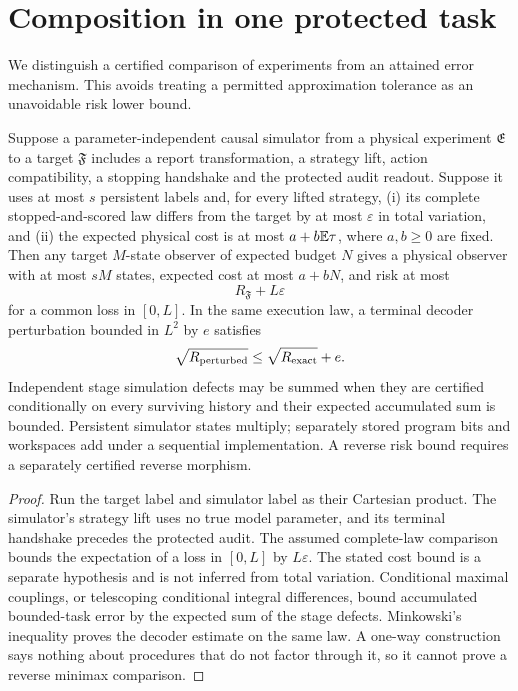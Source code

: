 \section{Composition in one protected task}\label{sec:composition}
We distinguish a certified comparison of experiments from an attained error mechanism. This avoids treating a permitted approximation tolerance as an unavoidable risk lower bound.

\begin{proposition}\label{prop:composition}
Suppose a parameter-independent causal simulator from a physical experiment $\mathfrak E$ to a target $\mathfrak F$ includes a report transformation, a strategy lift, action compatibility, a stopping handshake and the protected audit readout. Suppose it uses at most $s$ persistent labels and, for every lifted strategy, (i) its complete stopped-and-scored law differs from the target by at most $\varepsilon$ in total variation, and (ii) the expected physical cost is at most $a+b\mathbb E\tau$, where $a,b\ge0$ are fixed. Then any target $M$-state observer of expected budget $N$ gives a physical observer with at most $sM$ states, expected cost at most $a+bN$, and risk at most
\[
 R_{\mathfrak F}+L\varepsilon
\]
for a common loss in $[0,L]$. In the same execution law, a terminal decoder perturbation bounded in $L^2$ by $e$ satisfies
\[
 \sqrt{R_{\rm perturbed}}\le\sqrt{R_{\rm exact}}+e.
\]
Independent stage simulation defects may be summed when they are certified conditionally on every surviving history and their expected accumulated sum is bounded. Persistent simulator states multiply; separately stored program bits and workspaces add under a sequential implementation. A reverse risk bound requires a separately certified reverse morphism.
\end{proposition}
\begin{proof}
Run the target label and simulator label as their Cartesian product. The simulator's strategy lift uses no true model parameter, and its terminal handshake precedes the protected audit. The assumed complete-law comparison bounds the expectation of a loss in $[0,L]$ by $L\varepsilon$. The stated cost bound is a separate hypothesis and is not inferred from total variation. Conditional maximal couplings, or telescoping conditional integral differences, bound accumulated bounded-task error by the expected sum of the stage defects. Minkowski's inequality proves the decoder estimate on the same law. A one-way construction says nothing about procedures that do not factor through it, so it cannot prove a reverse minimax comparison.
\end{proof}

